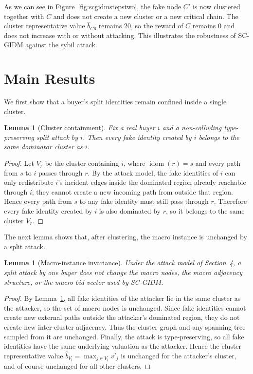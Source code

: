 \documentclass[sigconf]{aamas}
\newtheorem{lemma}[theorem]{Lemma}
\theoremstyle{definition}
\theoremstyle{remark}
\newcommand{\idom}{\operatorname{idom}}
\begin{document}
As we can see in Figure~\ref{fig:scgidmstepstwo}, the fake node $C'$ is now clustered together with $C$ and does not create a new cluster or a new critical chain. The cluster representative value $\widehat b_{C6}$ remains $20$, so the reward of $C$ remains $0$ and does not increase with or without attacking. This illustrates the robustness of SC-GIDM against the sybil attack.
\section{Main Results}
We first show that a buyer's split identities remain confined inside a single cluster.

\begin{lemma}[Cluster containment]
\label{lem:contain}
Fix a real buyer $i$ and a non-colluding type-preserving split attack by $i$. Then every fake identity created by $i$ belongs to the same dominator cluster as $i$.
\end{lemma}
\begin{proof}
Let $V_r$ be the cluster containing $i$, where $\idom(r)=s$ and every path from $s$ to $i$ passes through $r$. By the attack model, the fake identities of $i$ can only redistribute $i$'s incident edges inside the dominated region already reachable through $i$; they cannot create a new incoming path from outside that region. Hence every path from $s$ to any fake identity must still pass through $r$. Therefore every fake identity created by $i$ is also dominated by $r$, so it belongs to the same cluster $V_r$.
\end{proof}

The next lemma shows that, after clustering, the macro instance is unchanged by a split attack.
\begin{lemma}[Macro-instance invariance]
\label{lem:macro}
Under the attack model of Section~4, a split attack by one buyer does not change the macro nodes, the macro adjacency structure, or the macro bid vector used by SC-GIDM.
\end{lemma}
\begin{proof}
By Lemma~\ref{lem:contain}, all fake identities of the attacker lie in the same cluster as the attacker, so the set of macro nodes is unchanged. Since fake identities cannot create new external paths outside the attacker's dominated region, they do not create new inter-cluster adjacency. Thus the cluster graph and any spanning tree sampled from it are unchanged. Finally, the attack is type-preserving, so all fake identities have the same underlying valuation as the attacker. Hence the cluster representative value $\widehat b_{V_i}=\max_{j\in V_i} v'_j$ is unchanged for the attacker's cluster, and of course unchanged for all other clusters.
\end{proof}
\end{document}
